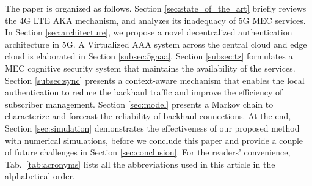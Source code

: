 \documentclass{ieeeaccess}
\newcommand{\change}[1]{#1}
\begin{document}
	The paper is organized as follows. Section \ref{sec:state_of_the_art} briefly reviews the 4G LTE AKA mechanism, and analyzes its inadequacy of 5G MEC services. In Section \ref{sec:architecture}, we propose a novel decentralized authentication architecture in 5G. A Virtualized AAA system across the central cloud and edge cloud is elaborated in Section \ref{subsec:5gaaa}. Section \ref{subsec:tz} formulates a MEC cognitive security system that maintains the availability of the services. Section \ref{subsec:sync} presents a context-aware mechanism that enables the local authentication to reduce the backhaul traffic and improve the efficiency of subscriber management. Section \ref{sec:model} presents a Markov chain to characterize and forecast the reliability of backhaul connections. {At the end, Section \ref{sec:simulation} demonstrates the effectiveness of our proposed method with numerical simulations, before we} conclude this paper and provide a couple of future challenges in Section \ref{sec:conclusion}. \change{For the readers' convenience, Tab.~\ref{tab:acronyms} lists all the abbreviations used in this article in the alphabetical order.}
\end{document}
